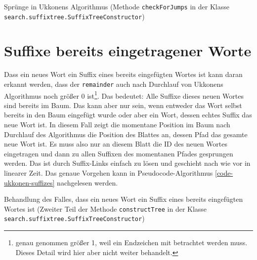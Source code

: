 \begin{algorithm}[H]
\caption{Sprünge in Ukkonens Algorithmus (Methode \texttt{checkForJumps} in der Klasse \texttt{search.suffixtree.SuffixTreeConstructor})}
\label{code-ukkonen-jump}
\begin{algorithmic}
		\ELSE
		\ENDIF
	\ENDWHILE
\ENDIF
\end{algorithmic}
\end{algorithm}

\section{Suffixe bereits eingetragener Worte}
\label{ukkonen-suffizes}

\paragraph{} Dass ein neues Wort ein Suffix eines bereits eingefügten Wortes ist kann daran erkannt werden, dass der \texttt{remainder} auch nach Durchlauf von Ukkonens Algorithmus noch größer 0 ist\footnote{genau genommen größer 1, weil ein Endzeichen mit betrachtet werden muss. Dieses Detail wird hier aber nicht weiter behandelt.}. Das bedeutet: Alle Suffixe dieses neuen Wortes sind bereits im Baum. Das kann aber nur sein, wenn entweder das Wort selbst bereits in den Baum eingefügt wurde oder aber ein Wort, dessen echtes Suffix das neue Wort ist. In diesem Fall zeigt die momentane Position im Baum nach Durchlauf des Algorithmus die Position des Blattes an, dessen Pfad das gesamte neue Wort ist. Es muss also nur an diesem Blatt die ID des neuen Wortes eingetragen und dann zu allen Suffixen des momentanen Pfades gesprungen werden. Das ist durch Suffix-Links einfach zu lösen und geschieht nach wie vor in linearer Zeit. Das genaue Vorgehen kann in Pseudocode-Algorithmus \ref{code-ukkonen-suffizes} nachgelesen werden.

\begin{algorithm}[H]
\caption{Behandlung des Falles, dass ein neues Wort ein Suffix eines bereits eingefügten Wortes ist (Zweiter Teil der Methode \texttt{constructTree} in der Klasse \texttt{search.suffixtree.SuffixTreeConstructor})}
\label{code-ukkonen-suffizes}
\begin{algorithmic}
\ENDWHILE
\end{algorithmic}
\end{algorithm}